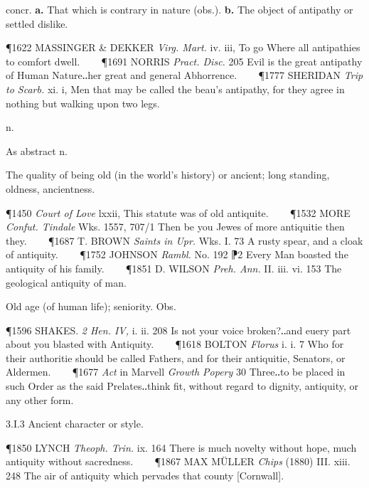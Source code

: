 \begin{description}[wide, labelwidth=!, labelindent=0pt]
\begin{myenumerate}
 concr. \textbf{a.} That which is contrary in nature (obs.). \textbf{b.} The object of antipathy or settled dislike.

\P 1622 MASSINGER \& DEKKER  \textit{Virg. Mart.} iv. iii, To go Where all antipathies to comfort dwell.    
\P 1691 NORRIS  \textit{Pract. Disc.} 205 Evil is the great antipathy of Human Nature‥her great and general Abhorrence.    
\P 1777 SHERIDAN  \textit{Trip to Scarb.} xi. i, Men that may be called the beau's antipathy, for they agree in nothing but walking upon two legs.
\end{myenumerate}


 n.

\noindent {}

\vspace{-0.3cm}

\begin{myenumerate}

 As abstract n.

 The quality of being old (in the world's history) or ancient; long standing, oldness, ancientness.

\P 1450 \textit{Court  of Love} lxxii, This statute was of old antiquite.    
\P 1532 MORE  \textit{Confut. Tindale} Wks. 1557, 707/1 Then be you Jewes of more antiquitie then they.    
\P 1687 T. BROWN  \textit{Saints in Upr.} Wks. I. 73 A rusty spear, and a cloak of antiquity.    
\P 1752 JOHNSON  \textit{Rambl.} No. 192 ⁋2 Every Man boasted the antiquity of his family.    
\P 1851 D. WILSON  \textit{Preh. Ann.} II. iii. vi. 153 The geological antiquity of man.

 Old age (of human life); seniority. Obs.

\P 1596 SHAKES.  \textit{2 Hen. IV,} i. ii. 208 Is not your voice broken?‥and euery part about you blasted with Antiquity.    
\P 1618 BOLTON  \textit{Florus} i. i. 7 Who for their authoritie should be called Fathers, and for their antiquitie, Senators, or Aldermen.    
\P 1677 \textit{Act} in  Marvell \textit{Growth Popery} 30 Three‥to be placed in such Order as the said Prelates‥think fit, without regard to dignity, antiquity, or any other form.

3.I.3 Ancient character or style.

\P 1850 LYNCH  \textit{Theoph. Trin.} ix. 164 There is much novelty without hope, much antiquity without sacredness.    
\P 1867 MAX MÜLLER  \textit{Chips} (1880) III. xiii. 248 The air of antiquity which pervades that county [Cornwall].


\end{myenumerate}
\end{description}
